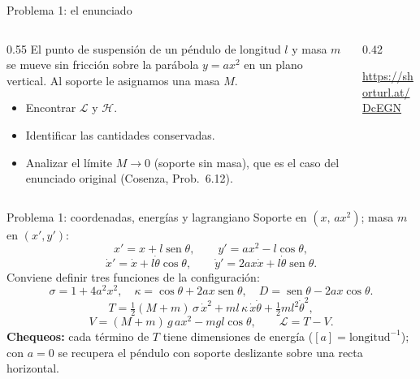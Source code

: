 \documentclass[spanish]{beamer}
\providecommand{\sen}{\operatorname{sen}}
\newcommand{\Lag}{\mathcal{L}}
\newcommand{\Ham}{\mathcal{H}}
\begin{document}
\begin{frame}{Problema 1: el enunciado}
\small
\begin{columns}
\begin{column}{0.55\textwidth}
El punto de suspensión de un péndulo de longitud $l$ y masa $m$ se mueve sin
fricción sobre la parábola $y=ax^2$ en un plano vertical. Al soporte le
asignamos una masa $M$.
\begin{itemize}
  \item<2-> Encontrar $\Lag$ y $\Ham$.
  \item<3-> Identificar las cantidades conservadas.
  \item<4-> Analizar el límite $M\to 0$ (soporte sin masa), que es el caso del
        enunciado original (Cosenza, Prob.~6.12).
\end{itemize}
\end{column}
\begin{column}{0.42\textwidth}
{\tiny \textcolor{red}{\url{https://shorturl.at/DcEGN}}}
\end{column} 
\end{columns}

\end{frame}

\begin{frame}{Problema 1: coordenadas, energías y lagrangiano}
Soporte en $(x,\,ax^2)$; masa $m$ en $(x',y')$:
\[
  x' = x + l\sen\theta, \qquad y' = ax^2 - l\cos\theta ,
\]
\[
  \dot x' = \dot x + l\dot\theta\cos\theta, \qquad
  \dot y' = 2ax\dot x + l\dot\theta\sen\theta .
\]
\pause
Conviene definir tres funciones de la configuración:
\[
  \sigma = 1+4a^2x^2, \quad
  \kappa = \cos\theta + 2ax\sen\theta, \quad
  D = \sen\theta - 2ax\cos\theta .
\]
\pause
\[
  T = \tfrac12 (M+m)\,\sigma\,\dot x^2 + m l\,\kappa\,\dot x\dot\theta
      + \tfrac12 m l^2 \dot\theta^2 ,
\]
\[
  V = (M+m)\,g\,a x^2 - m g l \cos\theta , \qquad \Lag = T - V .
\]
\pause
\textbf{Chequeos:} cada término de $T$ tiene dimensiones de energía
($[a]=\text{longitud}^{-1}$); con $a=0$ se recupera el péndulo con soporte
deslizante sobre una recta horizontal.
\end{frame}
\end{document}
